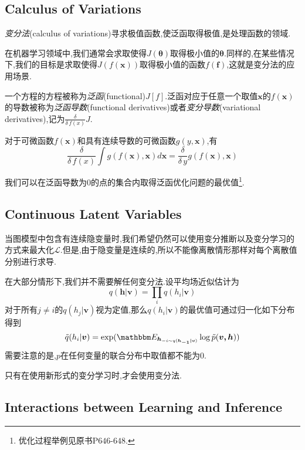 \subsection{Calculus of Variations}

\textit{变分法}(calculus of variations)寻求极值函数,使泛函取得极值,是处理函数的领域.

在机器学习领域中,我们通常会求取使得$J(\bm\theta)$取得极小值的$\bm\theta$.同样的,在某些情况下,我们的目标是求取使得$J(f(\bm x))$取得极小值的函数$f(\bm f)$,这就是变分法的应用场景.

一个方程的方程被称为\textit{泛函}(functional)$J[f]$.泛函对应于任意一个取值$\bm x$的$f(\bm x)$的导数被称为\textit{泛函导数}(functional derivatives)或者\textit{变分导数}(variational derivatives),记为$\frac{\delta}{\delta\,f(x)}J$.

对于可微函数$f(\bm x)$和具有连续导数的可微函数$g(y,\bm x)$,有
\begin{equation}
\frac{\delta}{\delta\,f(x)}\int g(f(\bm x),\bm x)d\bm x=\frac{\delta}{\delta\,y}g(f(\bm x),\bm x)
\end{equation}

我们可以在泛函导数为$0$的点的集合内取得泛函优化问题的最优值\footnote{优化过程举例见原书P$646$-$648$.}.

\subsection{Continuous Latent Variables}

当图模型中包含有连续隐变量时,我们希望仍然可以使用变分推断以及变分学习的方式来最大化$\mathcal L$.但是,由于隐变量是连续的,所以不能像离散情形那样对每个离散值分别进行求导.

在大部分情形下,我们并不需要解任何变分法.设平均场近似估计为
\begin{equation}
q(\bm{h|v})=\prod_iq(h_i|\bm v)
\end{equation}
对于所有$j\ne i$的$q(h_j|\bm v)$视为定值,那么$q(h_i|\bm v)$的最优值可通过归一化如下分布得到
\begin{equation}
\tilde q(h_i|\bm v)=\exp(\mathbbm E_{\bm h_{-i\sim q(\bm{h_{-1}|v})}}\log\tilde p(\bm{v,h}))
\end{equation}
需要注意的是,$p$在任何变量的联合分布中取值都不能为$0$.

只有在使用新形式的变分学习时,才会使用变分法.

\subsection{Interactions between Learning and Inference}

